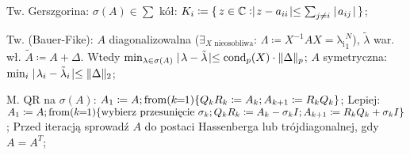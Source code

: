 \entry
Tw. Gerszgorina:
$\sigma(A) \in  \sum$ kół:
$K_i \coloneqq \set{z\in\mathbb{C}: \shortabs{z - a_{ii}} \leq \sum_{j \neq i}\shortabs{a_{ij}}}$;

\entry
Tw. (Bauer-Fike):
$A$ diagonalizowalna
($\exists_{X\text{ nieosobliwa}}$: $\Lambda \coloneqq X^{-1}AX=\mathrm{\lambda_i}_1^N$),
$\tilde{\lambda}$ war. wł. $\tilde{A} \coloneqq A + \Delta$.
Wtedy
$\min_{\lambda \in \sigma(A)} \shortabs{\lambda - \tilde{\lambda}} \leq
\cond[p]{X} \cdot \norm{\Delta}_p$;
\entry
$A$ symetryczna:
$\min_i\shortabs{\lambda_i - \tilde{\lambda}_i} \leq \norm{\Delta}_2$;

\entry
M. QR na $\sigma(A)$:
$ A_1 \coloneqq A;
\fromloop[1]{k}\{
Q_k R_k \coloneqq A_k;
A_{k+1} \coloneqq R_k Q_k
\} $;
\entry
Lepiej:
$ A_1 \coloneqq A;
\fromloop[1]{k}\{
\text{wybierz przesunięcie } \sigma_k;
Q_k R_k \coloneqq A_k - \sigma_kI;
A_{k+1} \coloneqq R_k Q_k + \sigma_kI
\} $;
\entry
Przed iteracją sprowadź $A$ do postaci Hassenberga lub trójdiagonalnej, gdy $A=A^T$;
